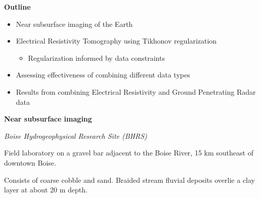 \documentclass[
paper=A6,landscape,
fontsize=11pt, %
pagesize, %
parskip=half-, %
]{scrartcl} %
\newenvironment{packed_enum}{
\begin{itemize}
  \setlength{\itemsep}{0pt}
  \setlength{\parskip}{0pt}
  \setlength{\parsep}{-2pt}
}{\end{itemize}}
\theoremstyle{mythmstyle} %
\begin{document}






{\large \bf Outline}
\begin{itemize}
\item Near subsurface imaging  of the Earth
\item Electrical Resistivity Tomography using Tikhonov regularization
\begin{itemize}
\item Regularization informed by data constraints
\end{itemize}
\item Assessing effectiveness of combining different data types
\item Results from combining Electrical Resistivity and Ground Penetrating Radar data
\end{itemize}
\clearpage

{\large \bf Near subsurface imaging}

\vspace*{.1in}

\centerline{ \it Boise Hydrogeophysical Research Site (BHRS)}
\vspace*{-.1in}
\begin{multicols}{2}
\vspace*{.0in}
\centerline{}
\columnbreak
\begin{packed_enum}
\item  Field laboratory on a gravel bar adjacent to the Boise River, 15 km southeast of downtown Boise.
\item Consists of coarse cobble and sand.  Braided stream fluvial deposits overlie a clay layer at about 20 m depth.
\end{packed_enum}
\end{multicols}
\vspace*{-.2in}
\end{document}
